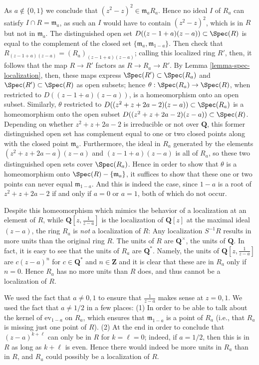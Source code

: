 \begin{example}
As $a \not \in \{0, 1\}$ we conclude that
$(z^2 - z)^2 \in \mathfrak m_a R_a$. Hence
no ideal $I$ of $R_a$ can satisfy $I \cap R = \mathfrak m_a$, as such
an $I$ would have to contain $(z^2 - z)^2$, which is in $R$ but not in
$\mathfrak m_a$. The distinguished open set
$D((z-1 + a)(z-a))\subset\Spec(R)$ is equal to the complement of
the closed set $\{\mathfrak{m}_a, \mathfrak{m}_{1-a}\}$.
Then check that $R_{(z-1 + a)(z-a)} = (R_a)_{(z-1 + a)(z-a)}$; calling
this localized ring $R'$, then, it follows that the map $R \to R'$
factors as $R \to R_a \to R'$.  By Lemma
\ref{lemma-spec-localization}, then, these maps express
$\Spec(R') \subset \Spec(R_a)$ and
$\Spec(R') \subset \Spec(R)$ as open subsets; hence
$\theta : \Spec(R_a) \to \Spec(R)$, when restricted to
$D((z-1 + a)(z-a))$, is a homeomorphism onto an open subset.
Similarly, $\theta$ restricted to
$D((z^2 + z + 2a-2)(z-a)) \subset \Spec(R_a)$ is a homeomorphism
onto the open subset $D((z^2 + z + 2a-2)(z-a)) \subset \Spec(R)$.
Depending on whether $z^2 + z + 2a-2$ is irreducible or not over
$\mathbf{Q}$, this former distinguished open set has complement
equal to one or two closed points along with the closed point
$\mathfrak{m}_a$. Furthermore, the ideal in $R_a$ generated by the
elements $(z^2 + z + 2a-a)(z-a)$ and $(z-1 + a)(z-a)$ is all of $R_a$, so
these two distinguished open sets cover $\Spec(R_a)$. Hence in
order to show that $\theta$ is a homeomorphism onto
$\Spec(R)-\{\mathfrak{m}_a\}$, it suffices to show
that these one or two points can never equal $\mathfrak{m}_{1-a}$.
And this is indeed the case, since $1-a$ is a root of $z^2 + z + 2a-2$
if and only if $a = 0$ or $a = 1$, both of which do not occur.

\medskip\noindent
Despite this homeomorphism which mimics the behavior of a
localization at an element of $R$, while
$\mathbf{Q}[z, \frac{1}{z-a}]$ is the localization of $\mathbf{Q}[z]$
at the maximal ideal $(z-a)$, the ring $R_a$ is {\it not} a
localization of $R$: Any localization $S^{-1}R$ results in more
units than the original ring $R$.  The units of $R$ are
$\mathbf{Q}^\times$, the units of $\mathbf{Q}$.  In fact, it is
easy to see that the units of $R_a$ are $\mathbf{Q}^*$.
Namely, the units of $\mathbf{Q}[z, \frac{1}{z - a}]$ are
$c (z - a)^n$ for $c \in \mathbf{Q}^*$ and $n \in \mathbf{Z}$
and it is clear that these are in $R_a$ only if $n = 0$.
Hence $R_a$ has no more units than
$R$ does, and thus cannot be a localization of $R$.

\medskip\noindent
We used the fact that $a\neq 0, 1$ to ensure that
$\frac{1}{z-a}$ makes sense at $z = 0, 1$.  We used the fact that
$a\neq 1/2$ in a few places: (1) In order to be able to talk about
the kernel of $\text{ev}_{1-a}$ on $R_a$, which ensures that
$\mathfrak{m}_{1-a}$ is a point of $R_a$ (i.e., that $R_a$ is
missing just one point of $R$). (2) At the end in order to conclude
that $(z-a)^{k + \ell}$ can only be in $R$ for $k = \ell = 0$; indeed, if
$a = 1/2$, then this is in $R$ as long as $k + \ell$ is even. Hence
there would indeed be more units in $R_a$ than in $R$, and $R_a$
could possibly be a localization of $R$.
\end{example}